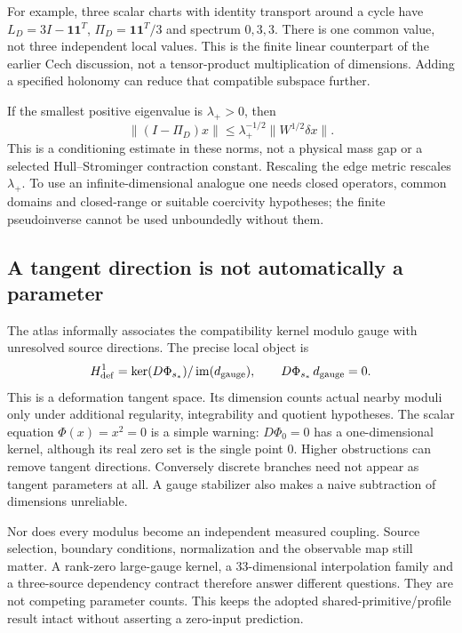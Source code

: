 \documentclass[11pt,a4paper]{article}
\begin{document}
For example, three scalar charts with identity transport around a cycle
have \(L_D=3I-\mathbf1\mathbf1^T\),
\(\Pi_D=\mathbf1\mathbf1^T/3\) and spectrum \(0,3,3\).
There is one common value, not three independent local values. This is
the finite linear counterpart of the earlier Cech discussion, not a
tensor-product multiplication of dimensions. Adding a specified
holonomy can reduce that compatible subspace further.

If the smallest positive eigenvalue is \(\lambda_+>0\), then
\begin{equation}
 \|(I-\Pi_D)x\|
 \leq \lambda_+^{-1/2}\|W^{1/2}\delta x\| .
 \tag{R2}\label{eq:atlas-gap}
\end{equation}
This is a conditioning estimate in these norms, not a physical mass gap
or a selected Hull--Strominger contraction constant. Rescaling the edge
metric rescales \(\lambda_+\). To use an infinite-dimensional analogue
one needs closed operators, common domains and closed-range or suitable
coercivity hypotheses; the finite pseudoinverse cannot be used
unboundedly without them.

\subsection{A tangent direction is not automatically a parameter}
\label{sec:atlas-tangent}

The atlas informally associates the compatibility kernel modulo gauge
with unresolved source directions. The precise local object is
\[
 H^1_{\rm def}=\ker(D\Phi_{s_*})/
                  \operatorname{im}(d_{\rm gauge}),
 \qquad D\Phi_{s_*}\,d_{\rm gauge}=0 .
\]
This is a deformation tangent space. Its dimension counts actual nearby
moduli only under additional regularity, integrability and quotient
hypotheses. The scalar equation \(\Phi(x)=x^2=0\) is a simple warning:
\(D\Phi_0=0\) has a one-dimensional kernel, although its real zero set is
the single point \(0\). Higher obstructions can remove tangent
directions. Conversely discrete branches need not appear as tangent
parameters at all. A gauge stabilizer also makes a naive subtraction of
dimensions unreliable.

Nor does every modulus become an independent measured coupling. Source
selection, boundary conditions, normalization and the observable map
still matter. A rank-zero large-gauge kernel, a 33-dimensional
interpolation family and a three-source dependency contract therefore
answer different questions. They are not competing parameter counts.
This keeps the adopted shared-primitive/profile result intact without
asserting a zero-input prediction.
\end{document}
